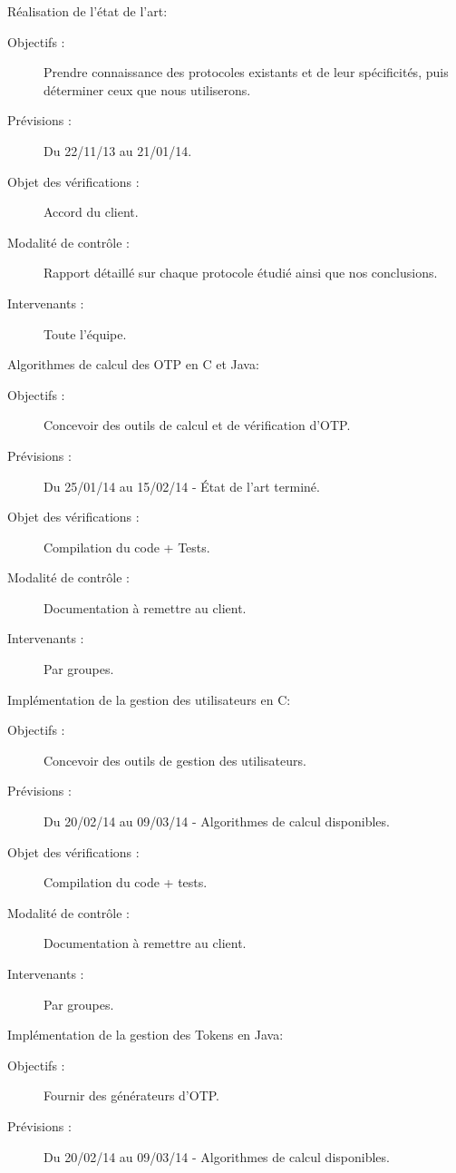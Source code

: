 \documentclass{../../res/univ-projet}
\begin{document}
\begin{description}
	\item Réalisation de l'état de l'art:
	\begin{description}
		\item[Objectifs :] Prendre connaissance des protocoles existants et de leur spécificités, puis déterminer ceux que nous utiliserons.
		\item[Prévisions :] Du 22/11/13 au 21/01/14.
		\item[Objet des vérifications :] Accord du client.
		\item[Modalité de contrôle :] Rapport détaillé sur chaque protocole étudié ainsi que nos conclusions.
		\item[Intervenants :] Toute l'équipe.
	\end{description}
	\vfill
	\item Algorithmes de calcul des OTP en C et Java:
	\begin{description}
		\item[Objectifs :] Concevoir des outils de calcul et de vérification d'OTP.
		\item[Prévisions :] Du 25/01/14 au 15/02/14 - État de l'art terminé.
		\item[Objet des vérifications :] Compilation du code + Tests.
		\item[Modalité de contrôle :] Documentation à remettre au client.
		\item[Intervenants :] Par groupes.
	\end{description}
	\vfill
	\item Implémentation de la gestion des utilisateurs en C:
	\begin{description}
		\item[Objectifs :] Concevoir des outils de gestion des utilisateurs.
		\item[Prévisions :] Du 20/02/14 au 09/03/14 - Algorithmes de calcul disponibles.
		\item[Objet des vérifications :] Compilation du code + tests.
		\item[Modalité de contrôle :] Documentation à remettre au client.
		\item[Intervenants :] Par groupes.
	\end{description}
	\vfill
	\item Implémentation de la gestion des Tokens en Java:
	\begin{description}
		\item[Objectifs :] Fournir des générateurs d'OTP.
		\item[Prévisions :] Du 20/02/14 au 09/03/14 - Algorithmes de calcul disponibles.

\end{description}
\end{description}
\end{document}
